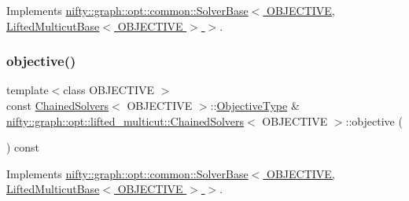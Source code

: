 Implements \hyperlink{classnifty_1_1graph_1_1opt_1_1common_1_1SolverBase_af638b9a804cfec3e35fe87c77e942d30}{nifty\+::graph\+::opt\+::common\+::\+Solver\+Base$<$ O\+B\+J\+E\+C\+T\+I\+V\+E, Lifted\+Multicut\+Base$<$ O\+B\+J\+E\+C\+T\+I\+V\+E $>$ $>$}.

\mbox{\label{classnifty_1_1graph_1_1opt_1_1lifted__multicut_1_1ChainedSolvers_a858016455b3b77d9757a96a891a44d92}} 
\subsubsection{\texorpdfstring{objective()}{objective()}}
{\footnotesize\ttfamily template$<$class O\+B\+J\+E\+C\+T\+I\+VE $>$ \\
const \hyperlink{classnifty_1_1graph_1_1opt_1_1lifted__multicut_1_1ChainedSolvers}{Chained\+Solvers}$<$ O\+B\+J\+E\+C\+T\+I\+VE $>$\+::\hyperlink{classnifty_1_1graph_1_1opt_1_1lifted__multicut_1_1ChainedSolvers_a59b16a41f7cc3aa24888584899f118e8}{Objective\+Type} \& \hyperlink{classnifty_1_1graph_1_1opt_1_1lifted__multicut_1_1ChainedSolvers}{nifty\+::graph\+::opt\+::lifted\+\_\+multicut\+::\+Chained\+Solvers}$<$ O\+B\+J\+E\+C\+T\+I\+VE $>$\+::objective (\begin{DoxyParamCaption}{ }\end{DoxyParamCaption}) const\hspace{0.3cm}{\ttfamily [virtual]}}



Implements \hyperlink{classnifty_1_1graph_1_1opt_1_1common_1_1SolverBase_a55e9eb645c07d6e0782ebfb990ab3c84}{nifty\+::graph\+::opt\+::common\+::\+Solver\+Base$<$ O\+B\+J\+E\+C\+T\+I\+V\+E, Lifted\+Multicut\+Base$<$ O\+B\+J\+E\+C\+T\+I\+V\+E $>$ $>$}.

\mbox{\label{classnifty_1_1graph_1_1opt_1_1lifted__multicut_1_1ChainedSolvers_a83025589cc3708c2f923c2d073560b00}} 
